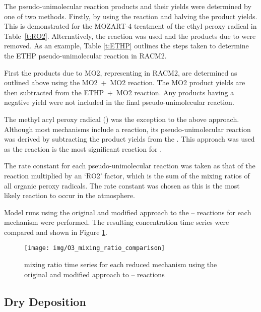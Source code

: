 The pseudo-unimolecular reaction products and their yields were determined by one of two methods.
Firstly, by using the  reaction and halving the product yields. 
This is demonstrated for the MOZART-4 treatment of the ethyl peroxy radical in \mbox{Table \ref{t:RO2}}. 
Alternatively, the  reaction was used and the products due to  were removed. 
As an example, Table \ref{t:ETHP} outlines the steps taken to determine the ETHP pseudo-unimolecular reaction in RACM2. 

First the products due to MO2, representing  in RACM2, are determined as outlined above using the \mbox{MO2 + MO2} reaction. 
The MO2 product yields are then subtracted from the \mbox{ETHP + MO2} reaction. 
Any products having a negative yield were not included in the final pseudo-unimolecular reaction.

The methyl acyl peroxy radical () was the exception to the above approach. 
Although most mechanisms include a \mbox{} reaction, its pseudo-unimolecular reaction was derived by subtracting the  product yields from the \mbox{}. 
This approach was used as the \mbox{} reaction is the most significant reaction for .

The rate constant for each pseudo-unimolecular reaction was taken as that of the \mbox{} reaction multiplied by an `RO2' factor, which is the sum of the mixing ratios of all organic peroxy radicals. 
The \mbox{} rate constant was chosen as this is the most likely reaction to occur in the atmosphere. 

Model runs using the original and modified approach to the -- reactions for each mechanism were performed.
The resulting  concentration time series were compared and shown in Figure \ref{f:O3_concentrations}.

\begin{figure}
    \begin{center}
        \texttt{[image: img/O3\_mixing\_ratio\_comparison]}
        \caption{ mixing ratio time series for each reduced mechanism using the original and modified approach to -- reactions}
        \label{f:O3_concentrations}
    \end{center}
\end{figure}


\subsection{Dry Deposition}


